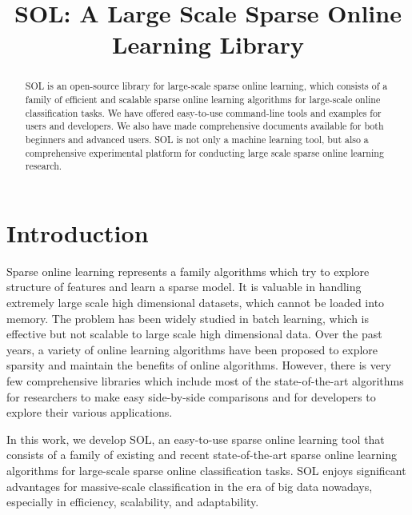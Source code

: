\documentclass[11pt,a4paper]{article}
\newcommand{\subtitle}[1]{%
  \posttitle{%
    \par\end{center}
    \begin{center}\large#1\end{center}
    \vskip0.5em}%
}
\begin{document}
\title{\LARGE\textsf{SOL}: A Large Scale Sparse Online Learning Library}

\subtitle{Version 0.1.0}

\author{}

\maketitle

\begin{abstract}%
    \textsf{SOL} is an open-source library for large-scale sparse online learning,
    which consists of a family of efficient and scalable sparse online learning
    algorithms for large-scale online  classification tasks. We have offered
    easy-to-use command-line tools and examples for users and developers. We also
    have made comprehensive documents available for both beginners and advanced
    users. SOL is not only a machine learning tool, but also a comprehensive
    experimental platform for conducting large scale sparse online learning research.
\end{abstract}

\newpage
\tableofcontents

\newpage

\section{Introduction}

Sparse online learning represents a family algorithms which try to explore
structure of features and learn a sparse model. It is valuable in handling
extremely large scale high dimensional datasets, which cannot be loaded into
memory.  The problem has been widely studied in batch learning, which is
effective but not scalable to large scale high dimensional data. Over the past
years, a variety of online learning algorithms have been proposed to explore
sparsity and maintain the benefits of online algorithms. However, there is very
few comprehensive libraries which include most of the state-of-the-art
algorithms for researchers to make easy side-by-side comparisons and for
developers to explore their various applications.

In this work, we develop \textsf{SOL}, an easy-to-use sparse online learning
tool that consists of a family of existing and recent state-of-the-art sparse
online learning algorithms for large-scale sparse online classification tasks.
SOL enjoys significant advantages for massive-scale classification in the era of big data nowadays, especially in efficiency,  scalability, and adaptability. 
\end{document}
